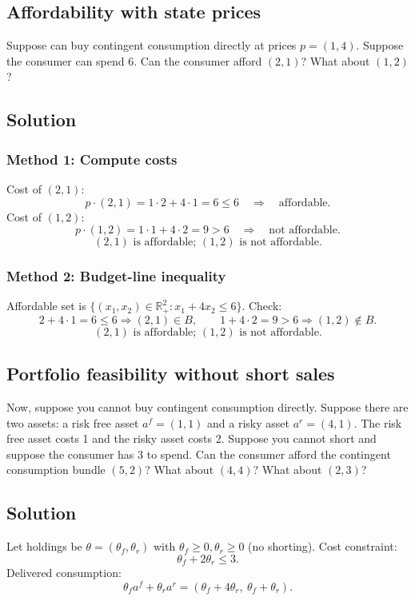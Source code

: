 \documentclass[12pt]{article}
\newcommand{\Rp}{\mathbb{R}_+}
\newcommand{\dotp}{\cdot}
\begin{document}
\subsection{Affordability with state prices}
Suppose can buy contingent consumption directly at prices \(p=(1,4)\). Suppose the
consumer can spend 6. Can the consumer afford \((2,1)\)? What about \((1,2)\)?

\subsection*{Solution}
\subsubsection*{Method 1: Compute costs}
Cost of \((2,1)\):
\[
p\dotp (2,1)=1\cdot 2+4\cdot 1=6 \le 6 \quad\Rightarrow\quad \text{affordable}.
\]
Cost of \((1,2)\):
\[
p\dotp (1,2)=1\cdot 1+4\cdot 2=9>6 \quad\Rightarrow\quad \text{not affordable}.
\]
\[
\boxed{\;(2,1)\text{ is affordable; }(1,2)\text{ is not affordable.}\;}
\]

\subsubsection*{Method 2: Budget-line inequality}
Affordable set is \(\{(x_1,x_2)\in\Rp^2: x_1+4x_2\le 6\}\).
Check:
\[
2+4\cdot 1=6\le 6 \Rightarrow (2,1)\in B,
\qquad
1+4\cdot 2=9>6 \Rightarrow (1,2)\notin B.
\]
\[
\boxed{\;(2,1)\text{ is affordable; }(1,2)\text{ is not affordable.}\;}
\]

\subsection{Portfolio feasibility without short sales}
Now, suppose you cannot buy contingent consumption directly. Suppose there are two
assets: a risk free asset \(a^f=(1,1)\) and a risky asset \(a^r=(4,1)\). The risk free asset costs
1 and the risky asset costs 2. Suppose you cannot short and suppose the consumer has
3 to spend. Can the consumer afford the contingent consumption bundle \((5,2)\)? What
about \((4,4)\)? What about \((2,3)\)?

\subsection*{Solution}
Let holdings be \(\theta=(\theta_f,\theta_r)\) with \(\theta_f\ge 0,\theta_r\ge 0\) (no shorting).
Cost constraint:
\[
\theta_f+2\theta_r\le 3.
\]
Delivered consumption:
\[
\theta_f a^f+\theta_r a^r=(\theta_f+4\theta_r,\ \theta_f+\theta_r).
\]
\end{document}
